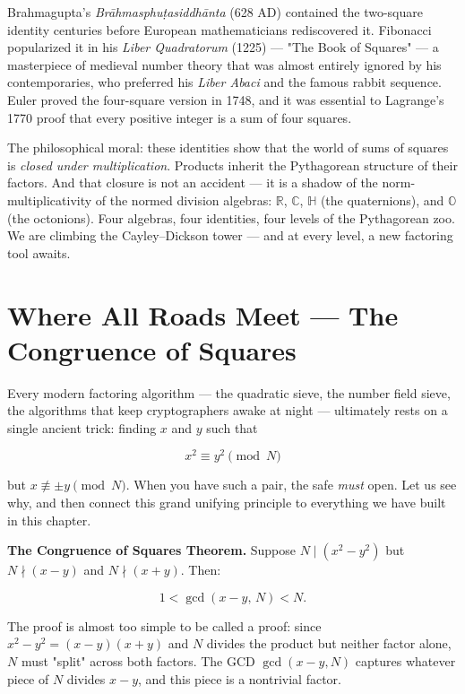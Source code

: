 Brahmagupta's \textit{Br\={a}hmasphu{\d{t}}asiddh\={a}nta} (628 AD) contained the two-square identity centuries before European mathematicians rediscovered it. Fibonacci popularized it in his \textit{Liber Quadratorum} (1225) --- "The Book of Squares" --- a masterpiece of medieval number theory that was almost entirely ignored by his contemporaries, who preferred his \textit{Liber Abaci} and the famous rabbit sequence. Euler proved the four-square version in 1748, and it was essential to Lagrange's 1770 proof that every positive integer is a sum of four squares.

The philosophical moral: these identities show that the world of sums of squares is \textit{closed under multiplication}. Products inherit the Pythagorean structure of their factors. And that closure is not an accident --- it is a shadow of the norm-multiplicativity of the normed division algebras: $\mathbb{R}$, $\mathbb{C}$, $\mathbb{H}$ (the quaternions), and $\mathbb{O}$ (the octonions). Four algebras, four identities, four levels of the Pythagorean zoo. We are climbing the Cayley--Dickson tower --- and at every level, a new factoring tool awaits.


\bigskip


\section{Where All Roads Meet --- The Congruence of Squares}

Every modern factoring algorithm --- the quadratic sieve, the number field sieve, the algorithms that keep cryptographers awake at night --- ultimately rests on a single ancient trick: finding $x$ and $y$ such that

\[
x^2 \equiv y^2 \pmod{N}
\]

but $x \not\equiv \pm y \pmod{N}$. When you have such a pair, the safe \textit{must} open. Let us see why, and then connect this grand unifying principle to everything we have built in this chapter.

\textbf{The Congruence of Squares Theorem.} Suppose $N \mid (x^2 - y^2)$ but $N \nmid (x - y)$ and $N \nmid (x + y)$. Then:

\[
1 < \gcd(x - y, \, N) < N.
\]

The proof is almost too simple to be called a proof: since $x^2 - y^2 = (x - y)(x + y)$ and $N$ divides the product but neither factor alone, $N$ must "split" across both factors. The GCD $\gcd(x - y, N)$ captures whatever piece of $N$ divides $x - y$, and this piece is a nontrivial factor.

